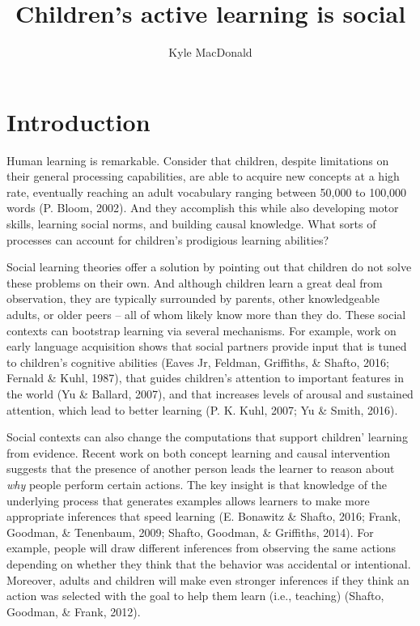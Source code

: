 \documentclass[a4paper,man,apacite,floatsintext]{apa6}
\date{}
\title{\textbf{Children's active learning is social}}
\author{Kyle MacDonald}
\affiliation{Department of Psychology, Stanford University}
\begin{document}
\maketitle

\section{Introduction}\label{introduction}

Human learning is remarkable. Consider that children, despite
limitations on their general processing capabilities, are able to
acquire new concepts at a high rate, eventually reaching an adult
vocabulary ranging between 50,000 to 100,000 words (P. Bloom, 2002). And
they accomplish this while also developing motor skills, learning social
norms, and building causal knowledge. What sorts of processes can
account for children's prodigious learning abilities?

Social learning theories offer a solution by pointing out that children
do not solve these problems on their own. And although children learn a
great deal from observation, they are typically surrounded by parents,
other knowledgeable adults, or older peers -- all of whom likely know
more than they do. These social contexts can bootstrap learning via
several mechanisms. For example, work on early language acquisition
shows that social partners provide input that is tuned to children's
cognitive abilities (Eaves Jr, Feldman, Griffiths, \& Shafto, 2016;
Fernald \& Kuhl, 1987), that guides children's attention to important
features in the world (Yu \& Ballard, 2007), and that increases levels
of arousal and sustained attention, which lead to better learning (P. K.
Kuhl, 2007; Yu \& Smith, 2016).

Social contexts can also change the computations that support children'
learning from evidence. Recent work on both concept learning and causal
intervention suggests that the presence of another person leads the
learner to reason about \emph{why} people perform certain actions. The
key insight is that knowledge of the underlying process that generates
examples allows learners to make more appropriate inferences that speed
learning (E. Bonawitz \& Shafto, 2016; Frank, Goodman, \& Tenenbaum,
2009; Shafto, Goodman, \& Griffiths, 2014). For example, people will
draw different inferences from observing the same actions depending on
whether they think that the behavior was accidental or intentional.
Moreover, adults and children will make even stronger inferences if they
think an action was selected with the goal to help them learn (i.e.,
teaching) (Shafto, Goodman, \& Frank, 2012).
\end{document}
